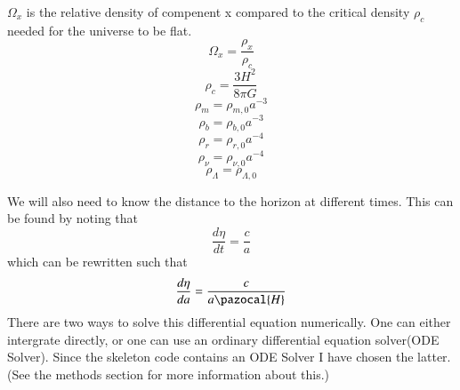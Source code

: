 \documentclass{aa}   %
\begin{document}
$\Omega_x$ is the relative density of compenent x compared to the critical density $\rho_c$ needed for the universe to be flat.
\begin{equation}
 \Omega_x = \frac{\rho_x}{\rho_c}
\end{equation}
\begin{equation}
 \rho_c = \frac{3H^2}{8\pi G}
\end{equation}
\begin{equation}
 \rho_m = \rho_{m,0}a^{-3}
\end{equation}
\begin{equation}
 \rho_b = \rho_{b,0}a^{-3}
\end{equation}
\begin{equation}
 \rho_r = \rho_{r,0}a^{-4}
\end{equation}
\begin{equation}
 \rho_\nu = \rho_{\nu,0}a^{-4}
\end{equation}
\begin{equation}
 \rho_\Lambda = \rho_{\Lambda,0}
\end{equation}

We will also need to know the distance to the horizon at different times. This can be found by noting that
\begin{equation*}
 \frac{d\eta}{dt} = \frac{c}{a}
\end{equation*}
which can be rewritten such that
\begin{equation}
 \frac{d\eta}{da} = \frac{c}{a \pazocal{H}}
\end{equation}
There are two ways to solve this differential equation numerically. One can either intergrate directly, or one can use an ordinary differential equation solver(ODE Solver). Since the skeleton code contains an ODE Solver I have chosen the latter. (See the methods section for more information about this.)


\end{document}

